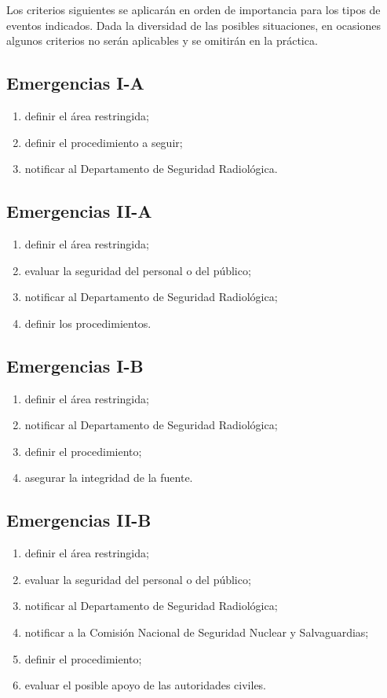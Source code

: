 Los criterios siguientes se aplicarán en orden de importancia para los tipos de eventos indicados. Dada la diversidad de las posibles situaciones, en ocasiones algunos criterios no serán aplicables y se omitirán en la práctica.

\subsection{Emergencias I-A}
\begin{enumerate}
  \item definir el área restringida;
  \item definir el procedimiento a seguir;
  \item notificar al Departamento de Seguridad Radiológica.
\end{enumerate}

\subsection{Emergencias II-A}
\begin{enumerate}
  \item definir el área restringida;
  \item evaluar la seguridad del personal o del público;
  \item notificar al Departamento de Seguridad Radiológica;
  \item definir los procedimientos.
\end{enumerate}

\subsection{Emergencias I-B}
\begin{enumerate}
  \item definir el área restringida;
  \item notificar al Departamento de Seguridad Radiológica;
  \item definir el procedimiento;
  \item asegurar la integridad de la fuente.
\end{enumerate}

\subsection{Emergencias II-B}
\begin{enumerate}
  \item definir el área restringida;
  \item evaluar la seguridad del personal o del público;
  \item notificar al Departamento de Seguridad Radiológica;
  \item notificar a la Comisión Nacional de Seguridad Nuclear y Salvaguardias;
  \item definir el procedimiento;
  \item evaluar el posible apoyo de las autoridades civiles.
\end{enumerate}
